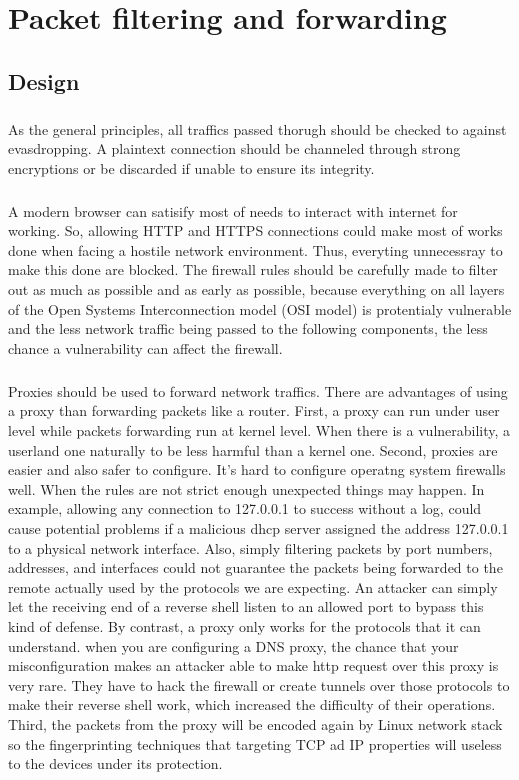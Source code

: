 \documentclass[mscthesis]{usiinfthesis}
\begin{document}
\chapter{Packet filtering and forwarding}
\section{Design}
\paragraph{}
As the general principles, all traffics passed thorugh should be checked to against evasdropping. A plaintext connection should be channeled through strong encryptions or be discarded if unable to ensure its integrity.
\paragraph{}
A modern browser can satisify most of needs to interact with internet for working. So, allowing HTTP and HTTPS connections could make most of works done when facing a hostile network environment. Thus, everyting unnecessray to make this done are blocked. The firewall rules should be carefully made to filter out as much as possible and as early as possible, because everything on all layers of the Open Systems Interconnection model (OSI model) is protentialy vulnerable and the less network traffic being passed to the following components, the less chance a vulnerability can affect the firewall.
\paragraph{}
Proxies should be used to forward network traffics. There are advantages of using a proxy than forwarding packets like a router. First, a proxy can run under user level while packets forwarding run at kernel level. When there is a vulnerability, a userland one naturally to be less harmful than a kernel one. Second, proxies are easier and also safer to configure. It's hard to configure operatng system firewalls well. When the rules are not strict enough unexpected things may happen. In example, allowing any connection to 127.0.0.1 to success without a log, could cause potential problems if a malicious dhcp server assigned the address 127.0.0.1 to a physical network interface. Also, simply filtering packets by port numbers, addresses, and interfaces could not guarantee the packets being forwarded to the remote actually used by the protocols we are expecting. An attacker can simply let the receiving end of a reverse shell listen to an allowed port to bypass this kind of defense. By contrast, a proxy only works for the protocols that it can understand. when you are configuring a DNS proxy, the chance that your misconfiguration makes an attacker able to make http request over this proxy is very rare. They have to hack the firewall or create tunnels over those protocols to make their reverse shell work, which increased the difficulty of their operations. Third, the packets from the proxy will be encoded again by Linux network stack so the fingerprinting techniques that targeting TCP ad IP properties will useless to the devices under its protection.
\end{document}
